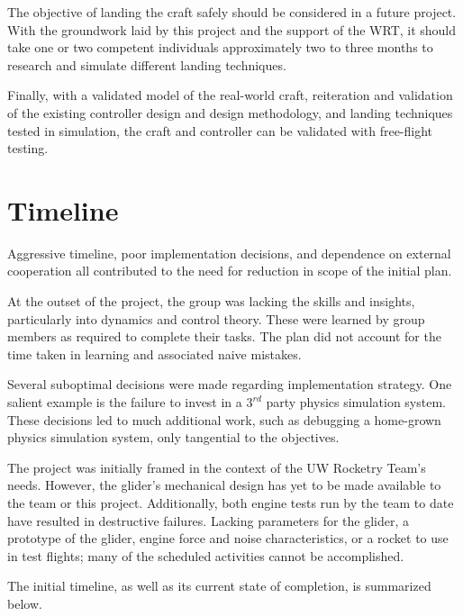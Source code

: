 \documentclass{sydeStyle}
\begin{document}
The objective of landing the craft safely should be considered in a future
project.  With the groundwork laid by this project and the support of the WRT,
it should take one or two competent individuals approximately two to three
months to research and simulate different landing techniques.

Finally, with a validated model of the real-world craft, reiteration and
validation of the existing controller design and design methodology, and landing
techniques tested in simulation, the craft and controller can be validated with
free-flight testing.

\appendix

\chapter{Timeline}


Aggressive timeline, poor implementation decisions, and dependence on external
cooperation all contributed to the need for reduction in scope of the initial
plan.

At the outset of the project, the group was lacking the skills and insights,
particularly into dynamics and control theory. These were learned by group
members as required to complete their tasks. The plan did not account for the
time taken in learning and associated naive mistakes.

Several suboptimal decisions were made regarding implementation strategy. One
salient example is the failure to invest in a $3^{rd}$ party physics simulation
system. These decisions led to much additional work, such as debugging a
home-grown physics simulation system, only tangential to the objectives.

The project was initially framed in the context of the UW Rocketry Team's needs.
However, the glider's mechanical design has yet to be made available to the team or
this project. Additionally, both engine tests run by the team to date have
resulted in destructive failures. Lacking parameters for the glider, a prototype
of the glider, engine force and noise characteristics, or a rocket to use in
test flights; many of the scheduled activities cannot be accomplished.

The initial timeline, as well as its current state of completion, is summarized
below.
\end{document}
